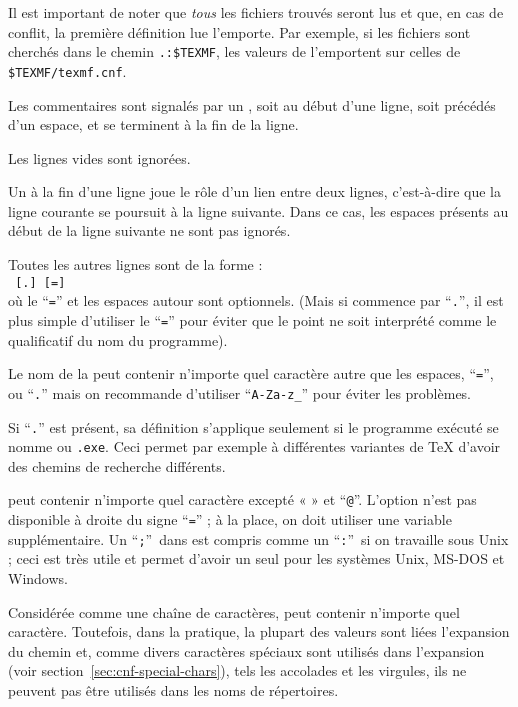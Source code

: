 \documentclass[german, english, french]{article}
\renewcommand{\samp}[1]{\enquote{\texttt{#1}}}
\begin{document}
Il est important de noter que \emph{tous} les fichiers  trouvés
seront lus et que, en cas de conflit, la première définition lue l'emporte. Par
exemple, si les fichiers  sont cherchés dans le chemin
\verb|.:$TEXMF|, les valeurs de  l'emportent sur celles de
\verb|$TEXMF/texmf.cnf|.

\begin{itemize*}
\item Les commentaires sont signalés par un \code{\%}, soit au début d'une
  ligne, soit précédés d'un espace, et se terminent à la fin de la ligne.
\item Les lignes vides sont ignorées.
\item Un \bs{} à la fin d'une ligne joue le rôle d'un lien entre deux lignes,
  c'est-à-dire que la ligne courante se poursuit à la ligne suivante. Dans ce
  cas, les espaces présents au début de la ligne suivante ne sont pas ignorés.
\item Toutes les autres lignes sont de la forme :\\
  \hspace*{2em}\texttt{ \textrm{[}.\textrm{]}
    \textrm{[}=\textrm{]} }\\[1pt]
  où le \samp{=} et les espaces autour sont optionnels. (Mais si 
  commence par \samp{.}, il est plus simple d'utiliser le \samp{=} pour éviter
  que le point ne soit interprété comme le qualificatif du nom du programme).
\item Le nom de la  peut contenir n'importe quel caractère autre
  que les espaces, \samp{=}, ou \samp{.} mais on recommande d'utiliser
  \samp{A-Za-z\_} pour éviter les problèmes.
\item Si \samp{.} est présent, sa définition s'applique seulement
  si le programme exécuté se nomme \texttt{} ou
  \texttt{.exe}. Ceci permet par exemple à différentes variantes
  de \TeX{} d'avoir des chemins de recherche différents.
\item {} peut contenir n'importe quel caractère excepté « \code{\%} »
  et \samp{@}.  L'option  n'est pas disponible
  à droite du signe \samp{=} ; à la place, on doit utiliser une variable
  supplémentaire. Un \samp{;}\ dans  est compris comme un \samp{:}\
  si on travaille sous Unix ; ceci est très utile et permet d'avoir un seul
  \file{texmf.cnf} pour les systèmes Unix, MS-DOS et Windows.
\item Considérée comme une chaîne de caractères,  peut contenir
  n'importe quel caractère.  Toutefois, dans la pratique, la plupart des valeurs
  \file{texmf.cnf} sont liées l'expansion du chemin et, comme divers caractères
  spéciaux sont utilisés dans l'expansion (voir
  section~\ref{sec:cnf-special-chars}), tels les accolades et les virgules, ils
  ne peuvent pas être utilisés dans les noms de répertoires.


\end{itemize*}
\end{document}
